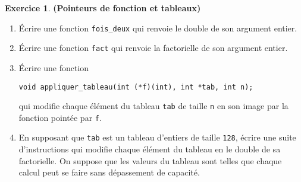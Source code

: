 \documentclass[12pt]{article}
\theoremstyle{definition}
\newtheorem{Exercice}{Exercice}
\begin{document}
\begin{Exercice} {\bf (Pointeurs de fonction et tableaux)}\smallskip
\begin{enumerate}
    \item Écrire une fonction {\tt fois\_deux} qui renvoie le double
    de son argument entier.
    \smallskip

    \item Écrire une fonction {\tt fact} qui renvoie la factorielle
    de son argument entier.
    \smallskip

    \item Écrire une fonction
\begin{lstlisting}
void appliquer_tableau(int (*f)(int), int *tab, int n);
\end{lstlisting}
    qui modifie chaque élément du tableau {\tt tab} de taille {\tt n}
    en son image par la fonction pointée par {\tt f}.
    \smallskip

    \item En supposant que {\tt tab} est un tableau d'entiers de taille
    {\tt 128}, écrire une suite d'instructions qui modifie chaque
    élément du tableau en le double de sa factorielle. On suppose que
    les valeurs du tableau sont telles que chaque calcul peut se faire
    sans dépassement de capacité.
\end{enumerate}
\end{Exercice}
\bigskip
\end{document}
